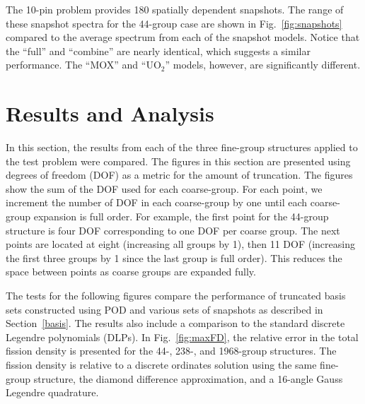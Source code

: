 \documentclass[5p,times,twocolumn,10pt]{elsarticle}
\newcommand{\FIG}[1]{Fig.~\ref{#1}}               %
\newcommand{\SEC}[1]{Section~\ref{#1}}               %
\begin{document}
    The 10-pin problem provides 180 spatially dependent snapshots.
    The range of these snapshot spectra for the 44-group case are shown in \FIG{fig:snapshots} compared to the average spectrum from each of the snapshot models.
    Notice that the ``full'' and ``combine'' are nearly identical, which suggests a similar performance.
    The ``MOX'' and ``UO$_2$'' models, however, are significantly different.

    \section{Results and Analysis}

    In this section, the results from each of the three fine-group structures applied to the test problem were compared.
    The figures in this section are presented using degrees of freedom (DOF) as a metric for the amount of truncation.
    The figures show the sum of the DOF used for each coarse-group.
    For each point, we increment the number of DOF in each coarse-group by one until each coarse-group expansion is full order.
    For example, the first point for the 44-group structure is four DOF corresponding to one DOF per coarse group.
    The next points are located at eight (increasing all groups by 1), then 11 DOF (increasing the first three groups by 1 since the last group is full order).
    This reduces the space between points as coarse groups are expanded fully.

    The tests for the following figures compare the performance of truncated basis sets constructed using POD and various sets of snapshots as described in \SEC{basis}.
    The results also include a comparison to the standard discrete Legendre polynomials (DLPs).
    In \FIG{fig:maxFD}, the relative error in the total fission density is presented for the 44-, 238-, and 1968-group structures.
    The fission density is relative to a discrete ordinates solution using the same fine-group structure, the diamond difference approximation, and a 16-angle Gauss Legendre quadrature.
\end{document}
